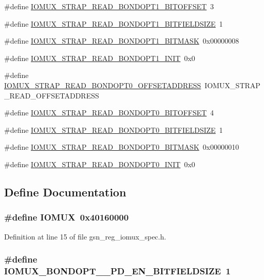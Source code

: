 \begin{DoxyCompactItemize}
\item 
\#define \hyperlink{a00560_a4881ba8955acf41518c716e1604a6710}{IOMUX\_\-STRAP\_\-READ\_\-BONDOPT1\_\-BITOFFSET}~3
\item 
\#define \hyperlink{a00560_a464424b35a1a3fb4242cc07d984340e1}{IOMUX\_\-STRAP\_\-READ\_\-BONDOPT1\_\-BITFIELDSIZE}~1
\item 
\#define \hyperlink{a00560_aac94393355b77b4c6f5e0d5718dadec0}{IOMUX\_\-STRAP\_\-READ\_\-BONDOPT1\_\-BITMASK}~0x00000008
\item 
\#define \hyperlink{a00560_af4ac354e664ccf10ef3795391f230263}{IOMUX\_\-STRAP\_\-READ\_\-BONDOPT1\_\-INIT}~0x0
\item 
\#define \hyperlink{a00560_a86f2e0ead3392570fa6ef7c27bb133cd}{IOMUX\_\-STRAP\_\-READ\_\-BONDOPT0\_\-OFFSETADDRESS}~IOMUX\_\-STRAP\_\-READ\_\-OFFSETADDRESS
\item 
\#define \hyperlink{a00560_ad399e1a81733e6179e3e16751f40621e}{IOMUX\_\-STRAP\_\-READ\_\-BONDOPT0\_\-BITOFFSET}~4
\item 
\#define \hyperlink{a00560_a5565c73b857d8bde151f1348a8a01f57}{IOMUX\_\-STRAP\_\-READ\_\-BONDOPT0\_\-BITFIELDSIZE}~1
\item 
\#define \hyperlink{a00560_a781040d74a7842c0fd78a4475ed56e03}{IOMUX\_\-STRAP\_\-READ\_\-BONDOPT0\_\-BITMASK}~0x00000010
\item 
\#define \hyperlink{a00560_ae3084e447f598cdb1267ddfaefcf22f9}{IOMUX\_\-STRAP\_\-READ\_\-BONDOPT0\_\-INIT}~0x0
\end{DoxyCompactItemize}


\subsection{Define Documentation}
\hypertarget{a00560_acf062214366711a616da00cf0ea9abaa}{
\subsubsection[{IOMUX}]{\setlength{\rightskip}{0pt plus 5cm}\#define IOMUX~0x40160000}}
\label{a00560_acf062214366711a616da00cf0ea9abaa}


Definition at line 15 of file gsn\_\-reg\_\-iomux\_\-spec.h.

\hypertarget{a00560_a71b24974d0e116e0d70475bed1daa86f}{
\subsubsection[{IOMUX\_\-BONDOPT\_\-0\_\-PD\_\-EN\_\-BITFIELDSIZE}]{\setlength{\rightskip}{0pt plus 5cm}\#define IOMUX\_\-BONDOPT\_\_\-PD\_\-EN\_\-BITFIELDSIZE~1}}
\label{a00560_a71b24974d0e116e0d70475bed1daa86f}


